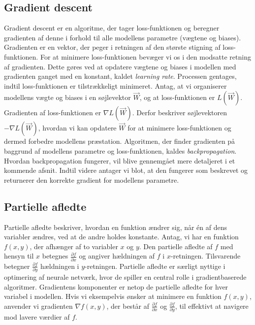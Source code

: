 \documentclass{article}
\begin{document}
\subsection{Gradient descent}
Gradient descent er en algoritme, der tager loss-funktionen og beregner gradienten af denne i forhold til alle modellens parametre (vægtene og biases). Gradienten er en vektor, der peger i retningen af den største stigning af loss-funktionen. For at minimere loss-funktionen bevæger vi os i den modsatte retning af gradienten. Dette gøres ved at opdatere vægtene og biases i modellen med gradienten ganget med en konstant, kaldet \textit{learning rate}. Processen gentages, indtil loss-funktionen er tilstrækkeligt minimeret. \parencite{IBM_2021, Sanderson_2017, Nielsen_2019a} Antag, at vi organiserer modellens vægte og biases i en søjlevektor $\vec{W}$, og at loss-funktionen er $L(\vec{W})$. Gradienten af loss-funktionen er $\nabla L(\vec{W})$. Derfor beskriver søjlevektoren $-\nabla L(\vec{W})$, hvordan vi kan opdatere $\vec{W}$ for at minimere loss-funktionen og dermed forbedre modellens præstation. Algoritmen, der finder gradienten på baggrund af modellens parametre og loss-funktionen, kaldes \textit{backpropagation}. \parencite{Sanderson_2017, Nielsen_2019a} Hvordan backpropagation fungerer, vil blive gennemgået mere detaljeret i et kommende afsnit. Indtil videre antager vi blot, at den fungerer som beskrevet og returnerer den korrekte gradient for modellens parametre.

\subsection{Partielle afledte}
Partielle afledte beskriver, hvordan en funktion ændrer sig, når én af dens variabler ændres, ved at de andre holdes konstante. Antag, vi har en funktion $f(x, y)$, der afhænger af to variabler $x$ og $y$. Den partielle afledte af $f$ med hensyn til $x$ betegnes $\frac{\partial f}{\partial x}$ og angiver hældningen af $f$ i $x$-retningen. Tilsvarende betegner $\frac{\partial f}{\partial y}$ hældningen i $y$-retningen. Partielle afledte er særligt nyttige i optimering af neurale netværk, hvor de spiller en central rolle i gradientbaserede algoritmer. Gradientens komponenter er netop de partielle afledte for hver variabel i modellen. Hvis vi eksempelvis ønsker at minimere en funktion $f(x, y)$, anvender vi gradienten $\nabla f(x, y)$, der består af $\frac{\partial f}{\partial x}$ og $\frac{\partial f}{\partial y}$, til effektivt at navigere mod lavere værdier af $f$. \parencite{Kirsanov_2024}
\end{document}
